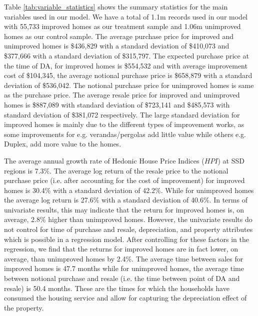 \documentclass[AEJ,reqno, draftmode]{AEA} %
\begin{document}
Table \ref{tab:variable_statistics} shows the summary statistics for the main variables used in our model. We have a total of 1.1m records used in our model with 55,733 improved homes as our treatment sample and 1.06m unimproved homes as our control sample. The average purchase price for improved and unimproved homes is \$436,829 with a standard deviation of \$410,073 and \$377,666 with a standard deviation of \$315,797. The expected purchase price at the time of DA, for improved homes is \$554,532 and with average improvement cost of \$104,345, the average notional purchase price is \$658,879 with a standard deviation of \$536,042. The notional purchase price for unimproved homes is same as the purchase price. The average resale price for improved and unimproved homes is \$887,089 with standard deviation of \$723,141 and \$485,573 with standard deviation of \$381,072 respectively. The large standard deviation for improved homes is mainly due to the different types of improvement works, as some improvements for e.g. verandas/pergolas add little value while others e.g. Duplex, add more value to the homes.

The average annual growth rate of Hedonic House Price Indices ($HPI$) at SSD regions is 7.3\%. The average log return of the resale price to the notional purchase price (i.e. after accounting for the cost of improvement) for improved homes is 30.4\% with a standard deviation of 42.2\%. While for unimproved homes the average log return is 27.6\% with a standard deviation of 40.6\%. In terms of univariate results, this may indicate that the return for improved homes is, on average, 2.8\% higher than unimproved homes. However, the univariate results do not control for time of purchase and resale, depreciation, and property attributes which is possible in a regression model. After controlling for these factors in the regression, we find that the returns for improved homes are in fact lower, on average, than unimproved homes by 2.4\%. The average time between sales for improved homes is 47.7 months while for unimproved homes, the average time between notional purchase and resale (i.e. the time between point of DA and resale) is 50.4 months. These are the times for which the households have consumed the housing service and allow for capturing the depreciation effect of the property.
\end{document}
